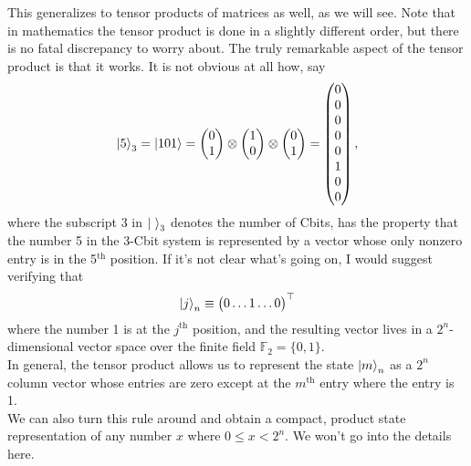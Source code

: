 \documentclass{book}
\theoremstyle{definition}
\begin{document}
This generalizes to tensor products of matrices as well, as we will see. Note that in mathematics the tensor product is done in a slightly different order, but there is no fatal discrepancy to worry about. The truly remarkable aspect of the tensor product is that it works. It is not obvious at all how, say
\begin{align}
\ket{5}_3 = \ket{101} = 
\begin{pmatrix}
0\\1
\end{pmatrix}\otimes
\begin{pmatrix}
1\\0
\end{pmatrix}\otimes
\begin{pmatrix}
0\\1
\end{pmatrix}
=
\begin{pmatrix}
0\\0\\0\\0\\0\\1\\0\\0
\end{pmatrix},
\end{align}
where the subscript 3 in $\ket{\,\,}_3$ denotes the number of Cbits, has the property that the number 5 in the 3-Cbit system is represented by a vector whose only nonzero entry is in the 5$^{\text{th}}$ position. If it's not clear what's going on, I would suggest verifying that 
\begin{align}
\ket{j}_n \equiv \begin{pmatrix}
0\dots 1 \dots 0
\end{pmatrix}^\top 
\end{align}
where the number 1 is at the $j^\text{th}$ position, and the resulting vector lives in a $2^n$-dimensional vector space over the finite field $\mathbb{F}_2 = \{0,1\}$. \\

In general, the tensor product allows us to represent the state $\ket{m}_n$ as a $2^n$ column vector whose entries are zero except at the $m^{\text{th}}$ entry where the entry is 1. \\

We can also turn this rule around and obtain a compact, product state representation of any number $x$ where $0 \leq x < 2^n$. We won't go into the details here. 
\end{document}
